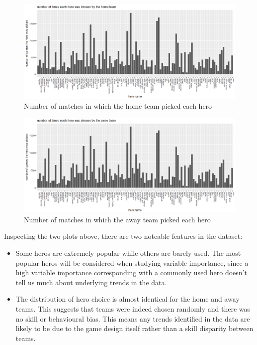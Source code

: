 \documentclass[10pt]{article}
\begin{document}
\begin{figure}[H]
\begin{center}
\includegraphics{home_team}
\caption {Number of matches in which the home team picked each hero}
\label{home}
\end {center}
\end {figure}

\begin{figure}[H]
\begin{center}
\includegraphics{away_team}
\caption {Number of matches in which the away team picked each hero}
\label{away}
\end {center}
\end {figure}

Inspecting the two plots above, there are two noteable features in the dataset:

\begin{itemize}
\item Some heros are extremely popular while others are barely used. The most popular heros will be considered when studying variable importance, since a high variable importance corresponding with a commonly used hero doesn't tell us much about underlying trends in the data.
\item The distribution of hero choice is almost identical for the home and away teams. This suggests that teams were indeed chosen randomly and there was no skill or behavioural bias. This means any trends identified in the data are likely to be due to the game design itself rather than a skill disparity between teams.
\end{itemize}
\end{document}
